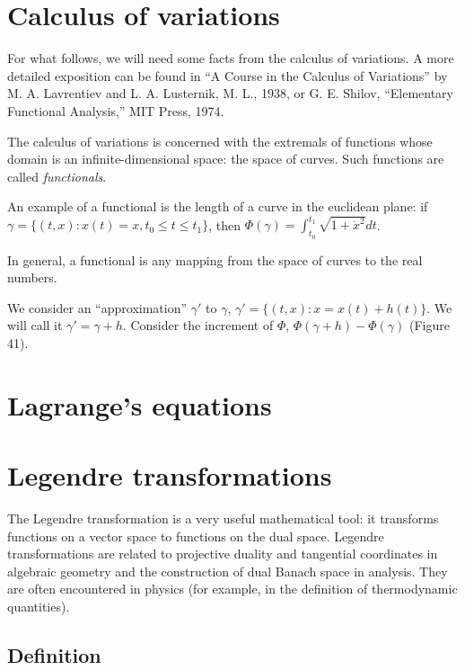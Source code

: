 \documentclass[leqno]{report}
\numberwithin{equation}{section}
\theoremstyle{plain}
\theoremstyle{definition}
\theoremstyle{remark}
\theoremstyle{smallcap}
\numberwithin{prob}{section}
\begin{document}
\section{Calculus of variations}

For what follows, we will need some facts from the calculus of variations.
%
A more detailed exposition can be found in
``A Course in the Calculus of Variations''
by M. A. Lavrentiev and L. A. Lusternik, M. L., 1938,
or
G. E. Shilov, ``Elementary Functional Analysis,''
MIT Press, 1974.


The calculus of variations is concerned with the extremals of
functions whose domain is an infinite-dimensional space:
the space of curves.
%
Such functions are called \emph{functionals}.

An example of a functional is the length of a curve in the euclidean plane:
if $\gamma = \{(t, x): x(t) = x,  t_0 \le t \le t_1 \}$,
then $\Phi(\gamma) = \int_{t_0}^{t_1} \sqrt{1 + {\dot x}^2 } dt$.

In general, a functional is any mapping from the space of curves
to the real numbers.

We consider an ``approximation'' $\gamma'$ to $\gamma$,
$\gamma' = \{(t, x): x = x(t) + h(t)\}$.
%
We will call it $\gamma' = \gamma + h$.
Consider the increment of $\Phi$,
$\Phi(\gamma + h) - \Phi(\gamma)$
(Figure 41).

\section{Lagrange's equations}




\section{Legendre transformations}

The Legendre transformation is a very useful mathematical tool:
it transforms functions on a vector space
to functions on the dual space.
%
Legendre transformations are related to
projective duality and tangential coordinates in algebraic geometry
and the construction of dual Banach space in analysis.
%
%
They are often encountered in physics
(for example, in the definition of thermodynamic quantities).

\subsection{Definition}
\end{document}
